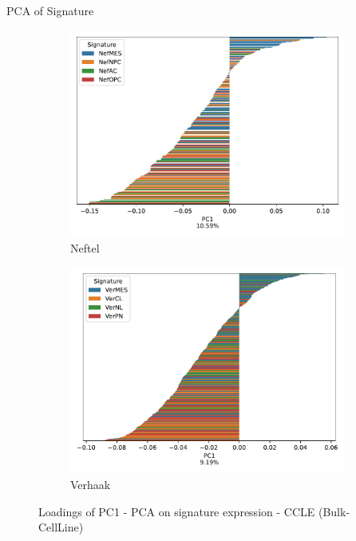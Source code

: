 \documentclass[aspectratio=169,9pt]{beamer}
\begin{document}
    \begin{frame}{PCA of Signature}
        \begin{adjustwidth}{-5cm}{-5cm}
            \centering
            \begin{figure}
                \centering
                \begin{subfigure}[c]{0.48\textwidth}
                    \centering
                    \includegraphics[width=\textwidth]{CCLE_loadings_barplot_Nef}
                    \caption{Neftel}
                \end{subfigure}
                \begin{subfigure}[c]{0.48\textwidth}
                    \centering
                    \includegraphics[width=\textwidth]{CCLE_loadings_barplot_Ver}
                    \caption{Verhaak}
                \end{subfigure}
                \caption{Loadings of PC1 - PCA on signature expression - CCLE (Bulk-CellLine)}
            \end{figure}
        \end{adjustwidth}
    \end{frame}
\end{document}
